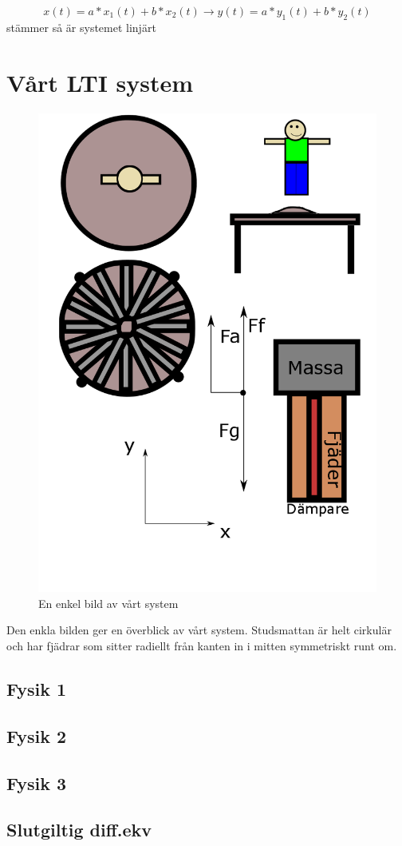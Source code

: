 \documentclass[10pt,a4paper]{article}
\begin{document}
\begin{equation}
x(t) = a*x_1(t) + b*x_2(t)\rightarrow y(t) = a*y_1(t) + b*y_2(t)
\end{equation}
stämmer så är systemet linjärt

\newpage
\section{Vårt LTI system}

\begin{figure}[ht]
\caption{En enkel bild av vårt system}
\includegraphics[scale=0.4]{Bild}
\end{figure}
\clearpage

Den enkla bilden ger en överblick av vårt system. Studsmattan är helt cirkulär och har fjädrar som sitter radiellt från kanten in i mitten symmetriskt runt om.

\subsection{Fysik 1}

\subsection{Fysik 2}

\subsection{Fysik 3}

\subsection{Slutgiltig diff.ekv}
\end{document}
